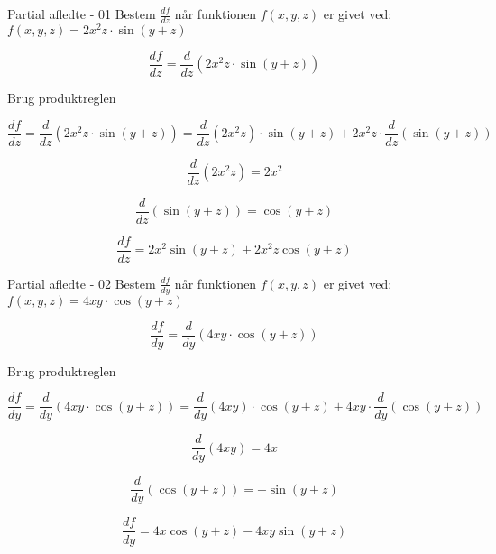 \documentclass{article}
\begin{document}
\tableofcontents
\newpage

\begin{exercise}{Partial afledte - 01}
Bestem $\frac{df}{dz}$ når funktionen $f(x,y,z)$ er givet ved:
$f(x,y,z) = 2x^2 z \cdot \sin(y+z)$ 


\hint
\[
\frac{df}{dz} = \frac{d}{dz} \left( 2x^2 z \cdot \sin(y+z)\right) 
\]

\hint
Brug produktreglen

\hint
\[
\frac{df}{dz} = \frac{d}{dz} \left( 2x^2 z \cdot \sin(y+z)\right) = \frac{d}{dz} \left( 2x^2 z \right) \cdot \sin(y+z) + 2x^2z \cdot \frac{d}{dz}\left( \sin(y+z)\right)
\]

\hint
\[
\frac{d}{dz} \left( 2x^2 z \right) = 2x^2
\]

\hint
\[
\frac{d}{dz}\left( \sin(y+z)\right) = \cos(y+z)
\]

\hint
\[
\frac{df}{dz}  = 2x^2 \sin(y+z) + 2x^2z \cos(y+z)
\]


\end{exercise}

\begin{exercise}{Partial afledte - 02}
	Bestem $\frac{df}{dy}$ når funktionen $f(x,y,z)$ er givet ved:
	$f(x,y,z) = 4xy \cdot \cos(y+z)$ 
	
	
	\hint
	\[
	\frac{df}{dy} = \frac{d}{dy} \left( 4xy \cdot \cos(y+z)\right) 
	\]
	
	\hint
	Brug produktreglen
	
	\hint
	\[
	\frac{df}{dy} = \frac{d}{dy} \left( 4xy \cdot \cos(y+z)\right) = \frac{d}{dy} \left(4xy \right) \cdot \cos(y+z) + 4xy \cdot \frac{d}{dy}\left( \cos(y+z)\right)
	\]
	
	\hint
	\[
	\frac{d}{dy} \left(4xy\right) = 4x
	\]
	
	\hint
	\[
	\frac{d}{dy}\left( \cos(y+z)\right) = -\sin(y+z)
	\]
	
	\hint
	\[
	\frac{df}{dy}  = 4x \cos(y+z) - 4xy \sin(y+z)
	\]
	
	
\end{exercise}
\end{document}
